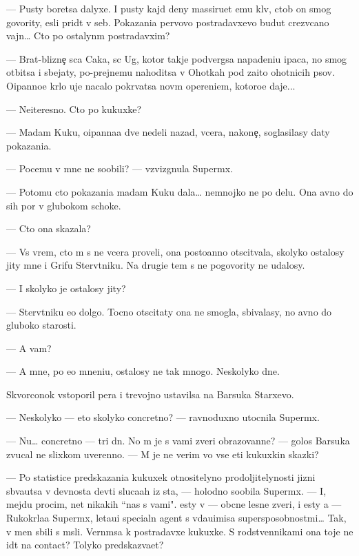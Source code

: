 \documentclass[12pt]{book}
\begin{document}
— Pusty boretsa dalyxe. I pusty kajd{\yi}{\y} deny massiru{\y}et {\y}emu kl{\iu}v, ctob{\yi} on smog govority, {\y}esli prid{\e}t v seb{\ia}. Pokazani{\y}a pervovo postradavxevo budut crezv{\yi}ca{\y}no vajn{\yi}… Cto po ostalyn{\yi}m postradavxim?

— Brat-blizne{\c} s{\yi}ca Caka, s{\yi}c Ug, kotor{\yi}{\y} takje podvergsa napadeni{\y}u {\X}ipaca, no smog otbitsa i sbejaty, po-prejnemu nahoditsa v Ohotkah pod za{\x}ito{\y} ohotnic{\yf}ih psov. O{\x}ipanno{\y}e kr{\yi}lo uje nacalo pokr{\yi}vatsa nov{\yi}m opereni{\y}em, kotoro{\y}e daje...

— Neiteresno. Cto po kukuxke?

— Madam Kuku, o{\x}ipanna{\y}a dve nedeli nazad, vcera, nakone{\c}, soglasilasy daty pokazani{\y}a.

— Pocemu v{\yi} mne ne soob{\x}ili? — vzvizgnula Superm{\yi}x.

— Potomu cto pokazani{\y}a madam Kuku dala… nemnojko ne po delu. Ona {\y}avno do sih por v glubokom schoke.

— Cto ona skazala?

— Vs{\e} vrem{\ia}, cto m{\yi} s ne{\y} vcera proveli, ona posto{\y}anno otscit{\yi}vala, skoly\-ko ostalosy jity mne i Grifu Sterv{\ia}tniku. Na drugi{\y}e tem{\yi} s ne{\y} pogovority ne udalosy.

— I skolyko je ostalosy jity?

— Sterv{\ia}tniku {\y}e{\x}o dolgo. Tocno otscitaty ona ne smogla, sbivalasy, no {\y}avno do gluboko{\y} starosti.

— A vam?

— A mne, po {\y}e{\y}o mneni{\y}u, ostalosy ne tak mnogo. Neskolyko dne{\y}.

Skvorconok vstopor{\x}il per{\y}a i trevojno ustavilsa na Barsuka Starxevo.

— Neskolyko — eto skolyko concretno? — ravnoduxno utocnila Superm{\yi}x.

— Nu… concretno — tri dn{\ia}. No m{\yi} je s vami zveri obrazovann{\yi}{\y}e? — golos Barsuka zvucal ne slixkom uverenno. — M{\yi} je ne verim vo vse eti kukuxkin{\yi} skazki?

— Po statistice predskazani{\y}a kukuxek otnositelyno prodoljitelynosti jizni sb{\yi}va{\y}utsa v dev{\ia}nosta dev{\ia}ti sluca{\y}ah iz sta, — holodno soob{\x}ila Superm{\yi}x. — I, mejdu procim, net nikakih ``nas s vami". {\Y}esty v{\yi} — ob{\yi}cn{\yi}{\y}e lesn{\yi}{\y}e zveri, i {\y}esty {\y}a — Rukokr{\yi}la{\y}a Superm{\yi}x, leta{\y}u{\x}i{\y} specialn{\yi}{\y} agent s v{\yi}da{\y}u{\x}imisa supersposobnost{\ia}mi… Tak, v{\yi} men{\ia} sbili s m{\yi}sli. Vern{\e}msa k postradavxe{\y} kukuxke. S rodstvennikami ona toje ne id{\e}t na contact? Tolyko predskaz{\yi}va{\y}et?
\end{document}
